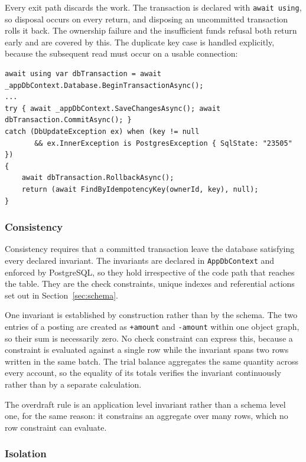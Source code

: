 \documentclass[11pt,a4paper]{article}
\newcommand{\code}[1]{\texttt{\fontsize{8.6}{10}\selectfont #1}}
\begin{document}
Every exit path discards the work. The transaction is declared with
\code{await using}, so disposal occurs on every return, and disposing an
uncommitted transaction rolls it back. The ownership failure and the
insufficient funds refusal both return early and are covered by this. The
duplicate key case is handled explicitly, because the subsequent read must
occur on a usable connection:

\begin{lstlisting}
await using var dbTransaction = await _appDbContext.Database.BeginTransactionAsync();
...
try { await _appDbContext.SaveChangesAsync(); await dbTransaction.CommitAsync(); }
catch (DbUpdateException ex) when (key != null
       && ex.InnerException is PostgresException { SqlState: "23505" })
{
    await dbTransaction.RollbackAsync();
    return (await FindByIdempotencyKey(ownerId, key), null);
}
\end{lstlisting}

\subsubsection*{Consistency}

Consistency requires that a committed transaction leave the database satisfying
every declared invariant. The invariants are declared in \code{AppDbContext}
and enforced by PostgreSQL, so they hold irrespective of the code path that
reaches the table. They are the check constraints, unique indexes and
referential actions set out in Section~\ref{sec:schema}.

One invariant is established by construction rather than by the schema. The two
entries of a posting are created as \code{+amount} and \code{-amount} within one
object graph, so their sum is necessarily zero. No check constraint can express
this, because a constraint is evaluated against a single row while the invariant
spans two rows written in the same batch. The trial balance aggregates the same
quantity across every account, so the equality of its totals verifies the
invariant continuously rather than by a separate calculation.

The overdraft rule is an application level invariant rather than a schema level
one, for the same reason: it constrains an aggregate over many rows, which no
row constraint can evaluate.

\subsubsection*{Isolation}
\end{document}
